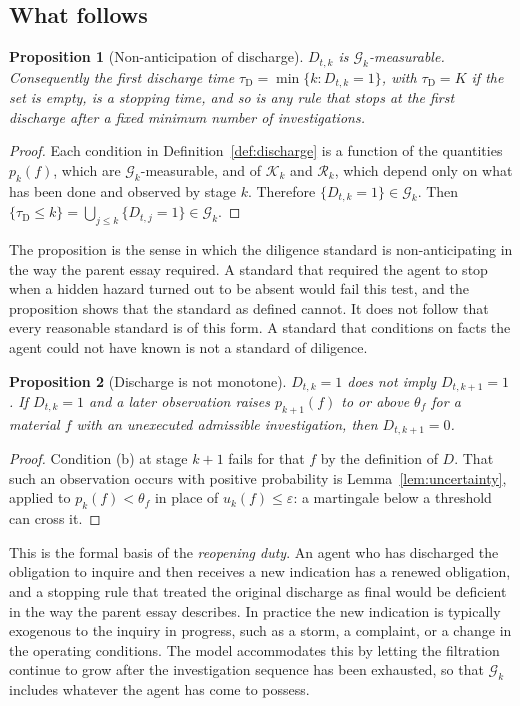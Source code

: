 \documentclass[11pt]{article}
\newcommand{\G}{\mathcal G}
\newcommand{\tD}{\tau_{\mathrm D}}
\theoremstyle{plain}
\newtheorem{proposition}{Proposition}
\theoremstyle{definition}
\begin{document}
\subsection{What follows}

\begin{proposition}[Non-anticipation of discharge]\label{prop:measurable}
$D_{t,k}$ is $\G_k$-measurable. Consequently the first discharge time $\tD=\min\{k:D_{t,k}=1\}$, with $\tD=K$ if the set is empty, is a stopping time, and so is any rule that stops at the first discharge after a fixed minimum number of investigations.
\end{proposition}

\begin{proof}
Each condition in Definition~\ref{def:discharge} is a function of the quantities $p_k(f)$, which are $\G_k$-measurable, and of $\mathcal K_k$ and $\mathcal R_k$, which depend only on what has been done and observed by stage $k$. Therefore $\{D_{t,k}=1\}\in\G_k$. Then $\{\tD\le k\}=\bigcup_{j\le k}\{D_{t,j}=1\}\in\G_k$.
\end{proof}

The proposition is the sense in which the diligence standard is non-anticipating in the way the parent essay required. A standard that required the agent to stop when a hidden hazard turned out to be absent would fail this test, and the proposition shows that the standard as defined cannot. It does not follow that every reasonable standard is of this form. A standard that conditions on facts the agent could not have known is not a standard of diligence.

\begin{proposition}[Discharge is not monotone]\label{prop:reopen}
$D_{t,k}=1$ does not imply $D_{t,k+1}=1$. If $D_{t,k}=1$ and a later observation raises $p_{k+1}(f)$ to or above $\theta_f$ for a material $f$ with an unexecuted admissible investigation, then $D_{t,k+1}=0$.
\end{proposition}

\begin{proof}
Condition (b) at stage $k+1$ fails for that $f$ by the definition of $D$. That such an observation occurs with positive probability is Lemma~\ref{lem:uncertainty}, applied to $p_k(f)<\theta_f$ in place of $u_k(f)\le\varepsilon$: a martingale below a threshold can cross it.
\end{proof}

This is the formal basis of the \emph{reopening duty}. An agent who has discharged the obligation to inquire and then receives a new indication has a renewed obligation, and a stopping rule that treated the original discharge as final would be deficient in the way the parent essay describes. In practice the new indication is typically exogenous to the inquiry in progress, such as a storm, a complaint, or a change in the operating conditions. The model accommodates this by letting the filtration continue to grow after the investigation sequence has been exhausted, so that $\G_k$ includes whatever the agent has come to possess.
\end{document}
